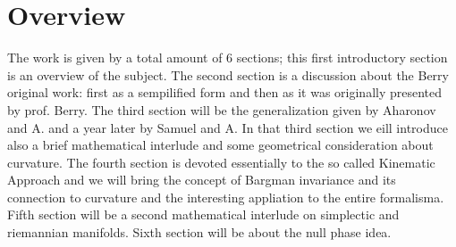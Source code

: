 
\chapter{Overview}

The work is given by a total amount of 6 sections; this first introductory section is an overview of the subject. The second section is a discussion about the Berry original work: first as a sempilified form and then as it was originally presented by prof. Berry. The third section will be the generalization given by Aharonov and A. and a year later by Samuel and A. In that third section we eill introduce also a brief mathematical interlude and some geometrical consideration about curvature. The fourth section is devoted essentially to the so called Kinematic Approach and we will bring the concept of Bargman invariance and its connection to curvature and the interesting appliation to the entire formalisma. Fifth section will be a second mathematical interlude on simplectic and riemannian manifolds. Sixth section will be about the null phase idea.

